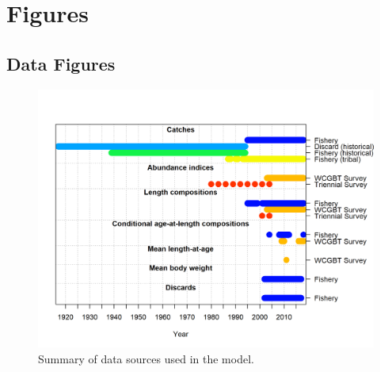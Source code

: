 \documentclass[]{article}
\title{}
\author{}
\date{}
\begin{document}
\FloatBarrier
\newpage

\hypertarget{figures}{%
\section{Figures}\label{figures}}

\hypertarget{data-figures}{%
\subsection{Data Figures}\label{data-figures}}

\begin{figure}[!h]
\begin{centering}
\includegraphics{r4ss/plots_mod1/data_plot.png}
\caption{Summary of data sources used in the model.}\label{fig:data_plot}
\end{centering}
\end{figure}

\newpage

\FloatBarrier

\newpage
\end{document}
